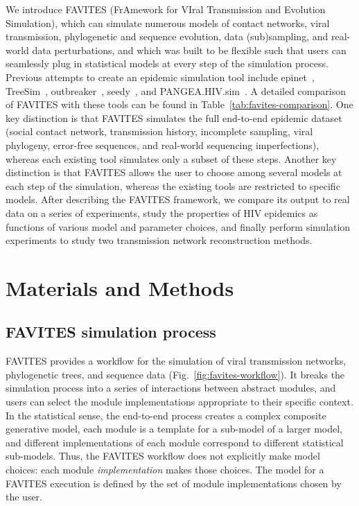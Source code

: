 We introduce FAVITES (FrAmework for VIral Transmission and Evolution Simulation), which can simulate numerous models of contact networks, viral transmission, phylogenetic and sequence evolution, data (sub)sampling, and real-world data perturbations, and which was built to be flexible such that users can seamlessly plug in statistical models at every step of the simulation process. Previous attempts to create an epidemic simulation tool include epinet~\cite{Groendyke2012}, TreeSim~\cite{Stadler2013}, outbreaker~\cite{Jombart2014}, seedy~\cite{Worby2015}, and PANGEA.HIV.sim~\cite{Ratmann2017}. A detailed comparison of FAVITES with these tools can be found in Table~\ref{tab:favites-comparison}. One key distinction is that FAVITES simulates the full end-to-end epidemic dataset (social contact network, transmission history, incomplete sampling, viral phylogeny, error-free sequences, and real-world sequencing imperfections), whereas each existing tool simulates only a subset of these steps. Another key distinction is that FAVITES allows the user to choose among several models at each step of the simulation, whereas the existing tools are restricted to specific models. After describing the FAVITES framework,  we compare its output to real data on a series of experiments, study the properties of \gls{HIV} epidemics as functions of various model and parameter choices, and finally perform simulation experiments to study two transmission network reconstruction methods.

\section{Materials and Methods}
\subsection{FAVITES simulation process}
\label{sec:favites-process}
FAVITES provides a workflow for the simulation of viral transmission networks, phylogenetic trees, and sequence data (Fig.~\ref{fig:favites-workflow}). It breaks the simulation process into a series of interactions between abstract modules, and users can select the module implementations appropriate to their specific context. In the statistical sense, the end-to-end process creates a complex composite generative model, each module is a template for a sub-model of a larger model, and different implementations of each module correspond to different statistical sub-models. Thus, the FAVITES workflow does not explicitly make model choices: each module \textit{implementation} makes those choices. The model for a FAVITES execution is defined by the set of module implementations chosen by the user.

